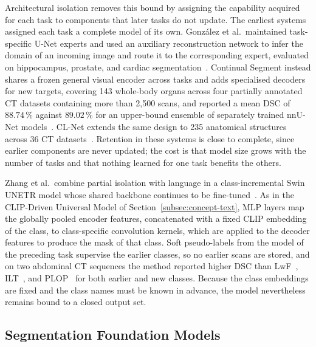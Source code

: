 Architectural isolation removes this bound by assigning the capability acquired for each task to components that later tasks do not update. The earliest systems assigned each task a complete model of its own. González et al.\ maintained task-specific U-Net experts and used an auxiliary reconstruction network to infer the domain of an incoming image and route it to the corresponding expert, evaluated on hippocampus, prostate, and cardiac segmentation~\cite{gonzalez2023wrongcontinuallearningmedical}. Continual Segment instead shares a frozen general visual encoder across tasks and adds specialised decoders for new targets, covering 143 whole-body organs across four partially annotated CT datasets containing more than 2,500 scans, and reported a mean DSC of $88.74\,\%$ against $89.02\,\%$ for an upper-bound ensemble of separately trained nnU-Net models~\cite{ji2023continualsegmentsingleunified}. CL-Net extends the same design to 235 anatomical structures across 36 CT datasets~\cite{guo2025continuallearningdrivenmodelaccurate}. Retention in these systems is close to complete, since earlier components are never updated; the cost is that model size grows with the number of tasks and that nothing learned for one task benefits the others.

Zhang et al.\ combine partial isolation with language in a class-incremental Swin UNETR model whose shared backbone continues to be fine-tuned~\cite{zhang2023continuallearningabdominalmultiorgan}. As in the CLIP-Driven Universal Model of Section~\ref{subsec:concept-text}, MLP layers map the globally pooled encoder features, concatenated with a fixed CLIP embedding of the class, to class-specific convolution kernels, which are applied to the decoder features to produce the mask of that class. Soft pseudo-labels from the model of the preceding task supervise the earlier classes, so no earlier scans are stored, and on two abdominal CT sequences the method reported higher DSC than LwF~\cite{li2017learningforgetting}, ILT~\cite{michieli2019incrementallearningtechniquessemantic}, and PLOP~\cite{douillard2021ploplearningforgettingcontinual} for both earlier and new classes. Because the class embeddings are fixed and the class names must be known in advance, the model nevertheless remains bound to a closed output set.

\subsection{Segmentation Foundation Models}
\label{subsec:cl-medseg-fm}

